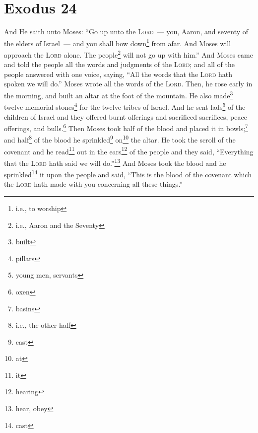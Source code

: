 \section{Exodus 24}\label{Exodus 24}
\begin{enumerate}[align=center]
     And He saith unto Moses: ``Go up unto the \textsc{Lord}~--- you, Aaron, and seventy of the elders of Israel~--- and you shall bow down\footnote{i.e., to worship} from afar.%
     And Moses will approach the \textsc{Lord} alone. The people\footnote{i.e., Aaron and the Seventy} will not go up with him.''%
     And Moses came and told the people all the words and judgments of the \textsc{Lord}; and all of the people answered with one voice, saying, ``All the words that the \textsc{Lord} hath spoken we will do.''%
     Moses wrote all the words of the \textsc{Lord}. Then, he rose early in the morning, and built an altar at the foot of the mountain. He also made\footnote{built} twelve memorial stones\footnote{pillars} for the twelve tribes of Israel.%
     And he sent lads\footnote{young men, servants} of the children of Israel and they offered burnt offerings and sacrificed sacrifices, peace offerings, and bulls.\footnote{oxen}%
     Then Moses took half of the blood and placed it in bowls;\footnote{basins} and half\footnote{i.e., the other half} of the blood he sprinkled\footnote{cast} on\footnote{at} the altar.%
     He took the scroll of the covenant and he read\footnote{it} out in the ears\footnote{hearing} of the people and they said, ``Everything that the \textsc{Lord} hath said we will do.''\footnote{hear, obey}%
     And Moses took the blood and he sprinkled\footnote{cast} it upon the people and said, ``This is the blood of the covenant which the \textsc{Lord} hath made with you concerning all these things.''%
\end{enumerate}
